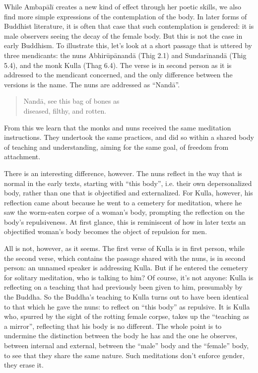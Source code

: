 \documentclass[12pt,openany]{book}%
\begin{document}
While \textsanskrit{Ambapālī} creates a new kind of effect through her poetic skills, we also find more simple expressions of the contemplation of the body. In later forms of Buddhist literature, it is often that case that such contemplation is gendered: it is male observers seeing the decay of the female body. But this is not the case in early Buddhism. To illustrate this, let’s look at a short passage that is uttered by three mendicants: the nuns \textsanskrit{Abhirūpānandā} (Thig 2.1) and \textsanskrit{Sundarīnandā} (Thig 5.4), and the monk Kulla (Thag 6.4). The verse is in second person as it is addressed to the mendicant concerned, and the only difference between the versions is the name. The nuns are addressed as “\textsanskrit{Nandā}”.

\begin{quotation}%
\textsanskrit{Nandā}, see this bag of bones as \\
diseased, filthy, and rotten.

%
\end{quotation}

From this we learn that the monks and nuns received the same meditation instructions. They undertook the same practices, and did so within a shared body of teaching and understanding, aiming for the same goal, of freedom from attachment.

There is an interesting difference, however. The nuns reflect in the way that is normal in the early texts, starting with “this body”, i.e. their own depersonalized body, rather than one that is objectified and externalized. For Kulla, however, his reflection came about because he went to a cemetery for meditation, where he saw the worm-eaten corpse of a woman’s body, prompting the reflection on the body’s repulsiveness. At first glance, this is reminiscent of how in later texts an objectified woman’s body becomes the object of repulsion for men.

All is not, however, as it seems. The first verse of Kulla is in first person, while the second verse, which contains the passage shared with the nuns, is in second person: an unnamed speaker is addressing Kulla. But if he entered the cemetery for solitary meditation, who is talking to him? Of course, it’s not anyone: Kulla is reflecting on a teaching that had previously been given to him, presumably by the Buddha. So the Buddha’s teaching to Kulla turns out to have been identical to that which he gave the nuns: to reflect on “this body” as repulsive. It is Kulla who, spurred by the sight of the rotting female corpse, takes up the “teaching as a mirror”, reflecting that his body is no different. The whole point is to undermine the distinction between the body he has and the one he observes, between internal and external, between the “male” body and the “female” body, to see that they share the same nature. Such meditations don’t enforce gender, they erase it.
\end{document}

